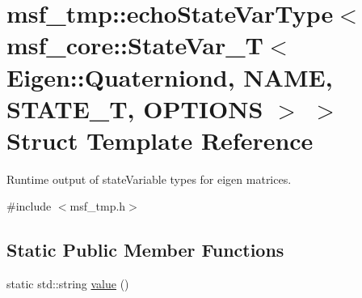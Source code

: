 \hypertarget{structmsf__tmp_1_1echoStateVarType_3_01msf__core_1_1StateVar__T_3_01Eigen_1_1Quaterniond_00_01NAd8d0cc57ae8a4161cb849186069681d6}{\section{msf\-\_\-tmp\-:\-:echo\-State\-Var\-Type$<$ msf\-\_\-core\-:\-:State\-Var\-\_\-\-T$<$ Eigen\-:\-:Quaterniond, N\-A\-M\-E, S\-T\-A\-T\-E\-\_\-\-T, O\-P\-T\-I\-O\-N\-S $>$ $>$ Struct Template Reference}
\label{structmsf__tmp_1_1echoStateVarType_3_01msf__core_1_1StateVar__T_3_01Eigen_1_1Quaterniond_00_01NAd8d0cc57ae8a4161cb849186069681d6}
}


Runtime output of state\-Variable types for eigen matrices.  




{\ttfamily \#include $<$msf\-\_\-tmp.\-h$>$}

\subsection*{Static Public Member Functions}
\begin{DoxyCompactItemize}
\item 
static std\-::string \hyperlink{structmsf__tmp_1_1echoStateVarType_3_01msf__core_1_1StateVar__T_3_01Eigen_1_1Quaterniond_00_01NAd8d0cc57ae8a4161cb849186069681d6_a1df57f3454008d5ff05028349e920f8e}{value} ()
\end{DoxyCompactItemize}


